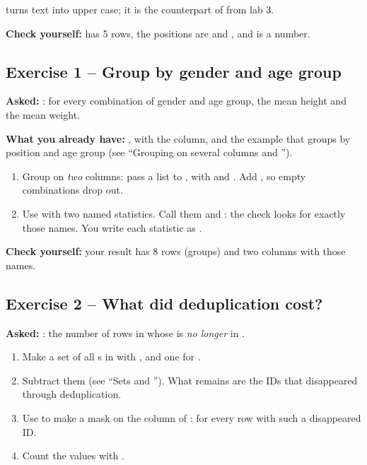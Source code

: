 \documentclass[11pt,a4paper]{article}
\begin{document}
 turns text into upper case; it is the counterpart of
 from lab 3.

\textbf{Check yourself:}  has 5 rows, the positions are
 and , and  is a number.

\subsection*{Exercise 1 -- Group by gender and age group}

\textbf{Asked:} : for every combination of
gender and age group, the mean height and the mean weight.

\textbf{What you already have:} , with the
 column, and the example that groups by position and age
group (see ``Grouping on several columns and '').

\begin{enumerate}
  \item Group on \emph{two} columns: pass a list to , with
         and . Add , so
        empty combinations drop out.
  \item Use  with two named statistics. Call them
         and : the check looks
        for exactly those names. You write each statistic as
        .
\end{enumerate}

\textbf{Check yourself:} your result has 8 rows (groups) and two columns
with those names.

\subsection*{Exercise 2 -- What did deduplication cost?}

\textbf{Asked:} : the number of rows in
 whose  is \emph{no longer} in
.

\begin{enumerate}
  \item Make a set of all s in  with
        , and one for .
  \item Subtract them (see ``Sets and ''). What remains are the
        IDs that disappeared through deduplication.
  \item Use  to make a mask on the 
        column of :  for every row with such
        a disappeared ID.
  \item Count the  values with .
\end{enumerate}
\end{document}
